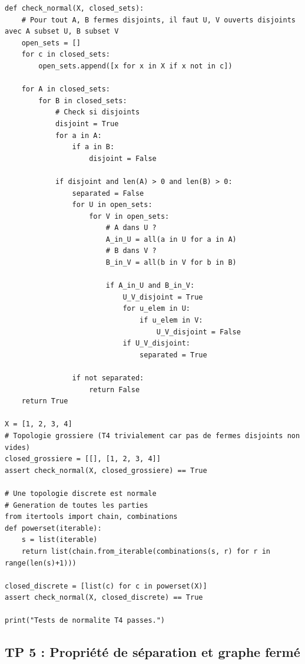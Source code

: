 \documentclass[11pt,a4paper]{article}
\begin{document}
\begin{lstlisting}
def check_normal(X, closed_sets):
    # Pour tout A, B fermes disjoints, il faut U, V ouverts disjoints avec A subset U, B subset V
    open_sets = []
    for c in closed_sets:
        open_sets.append([x for x in X if x not in c])

    for A in closed_sets:
        for B in closed_sets:
            # Check si disjoints
            disjoint = True
            for a in A:
                if a in B:
                    disjoint = False

            if disjoint and len(A) > 0 and len(B) > 0:
                separated = False
                for U in open_sets:
                    for V in open_sets:
                        # A dans U ?
                        A_in_U = all(a in U for a in A)
                        # B dans V ?
                        B_in_V = all(b in V for b in B)

                        if A_in_U and B_in_V:
                            U_V_disjoint = True
                            for u_elem in U:
                                if u_elem in V:
                                    U_V_disjoint = False
                            if U_V_disjoint:
                                separated = True

                if not separated:
                    return False
    return True

X = [1, 2, 3, 4]
# Topologie grossiere (T4 trivialement car pas de fermes disjoints non vides)
closed_grossiere = [[], [1, 2, 3, 4]]
assert check_normal(X, closed_grossiere) == True

# Une topologie discrete est normale
# Generation de toutes les parties
from itertools import chain, combinations
def powerset(iterable):
    s = list(iterable)
    return list(chain.from_iterable(combinations(s, r) for r in range(len(s)+1)))

closed_discrete = [list(c) for c in powerset(X)]
assert check_normal(X, closed_discrete) == True

print("Tests de normalite T4 passes.")
\end{lstlisting}





\subsection{TP 5 : Propriété de séparation et graphe fermé}
\end{document}
